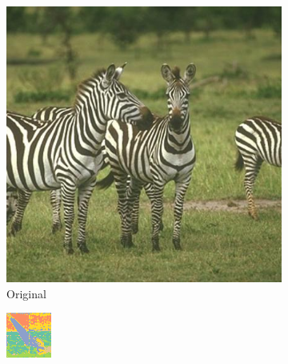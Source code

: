 \documentclass{beamer}
\begin{document}
\begin{frame}
\begin{figure}
\begin{subfigure}[b]{0.16\textwidth}
            \includegraphics[width=\textwidth]{../figures/dino/tile_2/253027.jpg}
            \caption{Original}
        \end{subfigure}
        \hfill
        \begin{subfigure}[b]{0.16\textwidth}
            \centering
            \includegraphics[width=\textwidth]{../figures/dino/tile_2/62096_seg.png}

\end{subfigure}
\end{figure}
\end{frame}
\end{document}
